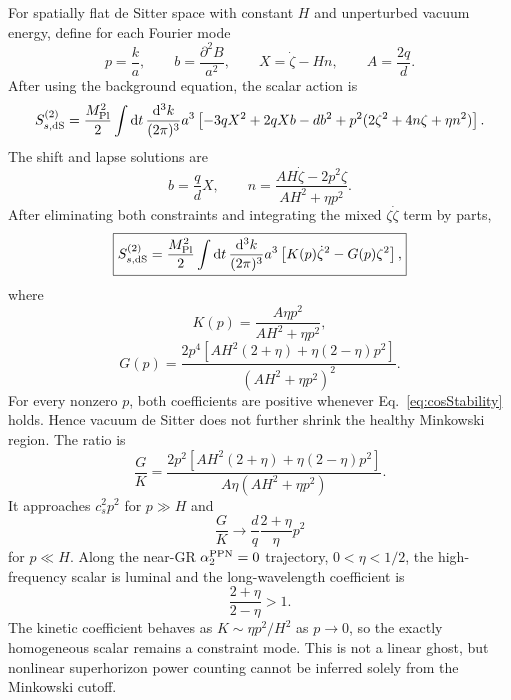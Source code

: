 \documentclass[11pt]{article}
\newcommand{\Mpl}{M_{\rm Pl}}
\newcommand{\dd}{\mathrm{d}}
\newcommand{\cs}{c_s}
\newcommand{\atwo}{\alpha_2^{\rm PPN}}
\begin{document}
For spatially flat de Sitter space with constant $H$ and unperturbed vacuum energy, define for each Fourier mode
\begin{equation}
p=\frac{k}{a},\qquad b=\frac{\partial^2B}{a^2},
\qquad X=\dot\zeta-Hn,
\qquad A=\frac{2q}{d}.
\end{equation}
After using the background equation, the scalar action is
\begin{equation}
S_{s,\rm dS}^{(2)}=\frac{\Mpl^2}{2}\int\dd t\,\frac{\dd^3k}{(2\pi)^3}a^3
\left[-3qX^2+2qXb-db^2+p^2(2\zeta^2+4n\zeta+\eta n^2)\right].
\label{eq:cosRawDS}
\end{equation}
The shift and lapse solutions are
\begin{equation}
b=\frac{q}{d}X,
\qquad
n=\frac{AH\dot\zeta-2p^2\zeta}{AH^2+\eta p^2}.
\label{eq:cosConstraintsDS}
\end{equation}
After eliminating both constraints and integrating the mixed $\zeta\dot\zeta$ term by parts,
\begin{equation}
\boxed{
S_{s,\rm dS}^{(2)}=\frac{\Mpl^2}{2}\int\dd t\,\frac{\dd^3k}{(2\pi)^3}a^3
\left[K(p)\dot\zeta^2-G(p)\zeta^2\right],}
\label{eq:cosReducedDS}
\end{equation}
where
\begin{equation}
K(p)=\frac{A\eta p^2}{AH^2+\eta p^2},
\label{eq:cosKDS}
\end{equation}
\begin{equation}
G(p)=\frac{2p^4\left[AH^2(2+\eta)+\eta(2-\eta)p^2\right]}
{(AH^2+\eta p^2)^2}.
\label{eq:cosGDS}
\end{equation}
For every nonzero $p$, both coefficients are positive whenever Eq.~\eqref{eq:cosStability} holds.  Hence vacuum de Sitter does not further shrink the healthy Minkowski region.  The ratio is
\begin{equation}
\frac{G}{K}=\frac{2p^2\left[AH^2(2+\eta)+\eta(2-\eta)p^2\right]}
{A\eta(AH^2+\eta p^2)}.
\label{eq:cosDispDS}
\end{equation}
It approaches $\cs^2p^2$ for $p\gg H$ and
\begin{equation}
\frac{G}{K}\longrightarrow
\frac{d}{q}\frac{2+\eta}{\eta}p^2
\end{equation}
for $p\ll H$.  Along the near-GR $\atwo=0$ trajectory, $0<\eta<1/2$, the high-frequency scalar is luminal and the long-wavelength coefficient is
\begin{equation}
\frac{2+\eta}{2-\eta}>1.
\end{equation}
The kinetic coefficient behaves as $K\sim\eta p^2/H^2$ as $p\to0$, so the exactly homogeneous scalar remains a constraint mode.  This is not a linear ghost, but nonlinear superhorizon power counting cannot be inferred solely from the Minkowski cutoff.
\end{document}
